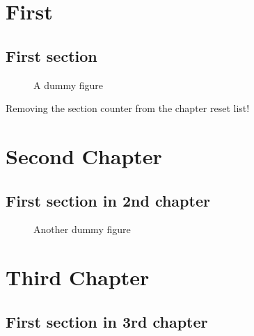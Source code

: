 \documentclass{book}
\newcommand{\showfullresetlist}[1]{%
\item Counter name: #1 \hfill \csname the#1\endcsname%
}
\begin{document}

\tableofcontents

\chapter{First} 

\section{First section}
\begin{itemize}
\end{itemize}

\begin{figure}
\caption{A dummy figure}
\end{figure}

Removing the section counter from the chapter reset list!


\chapter{Second Chapter}

\section{First section in 2nd chapter}
\begin{itemize}
\end{itemize}

\begin{figure}
\caption{Another dummy figure}
\end{figure}








\chapter{Third Chapter}

\section{First section in 3rd chapter}

\setcounter{dummyctrb}{4}
\end{document}
